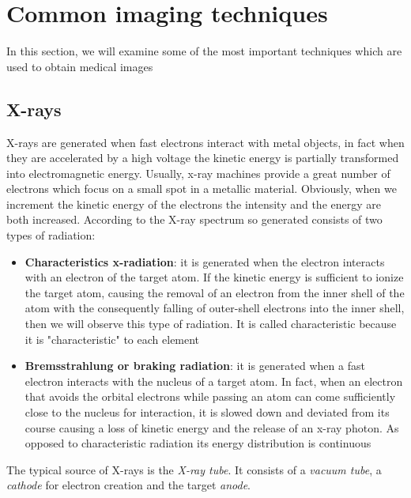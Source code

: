 \section{Common imaging techniques}\label{sec13:imageTechniques}
In this section, we will examine some of the most important techniques which are used to obtain medical images

\subsection{X-rays}

X-rays are generated when fast electrons interact with metal objects, in fact when they are accelerated by a high voltage the kinetic energy is partially transformed into electromagnetic energy. Usually, x-ray machines provide a great number of electrons which focus on a small spot in a metallic material. Obviously, when we increment the kinetic energy of the electrons the intensity and the energy are both increased. According to \cite{Birkfellner} the X-ray spectrum so generated consists of two types of radiation:
\begin{itemize}
 \item \textbf{Characteristics x-radiation}: it is generated when the electron interacts with an electron of the target atom. If the kinetic energy is sufficient to ionize the target atom, causing the removal of an electron from the inner shell of the atom with the consequently falling of outer-shell electrons into the inner shell, then we will observe this type of radiation. It is called characteristic because it is "characteristic" to each element
 \item \textbf{Bremsstrahlung or braking radiation}: it is generated when a fast electron interacts with the nucleus of a target atom. In fact, when an electron that avoids the orbital electrons while passing an atom can come sufficiently close to the nucleus for interaction, it is slowed down and deviated from its course causing a loss of kinetic energy and the release of an x-ray photon. As opposed to characteristic radiation its energy distribution is continuous
\end{itemize}

The typical source of X-rays is the \textit{X-ray tube}. It consists of a \textit{vacuum tube}, a \textit{cathode} for electron creation and the target \textit{anode}.

